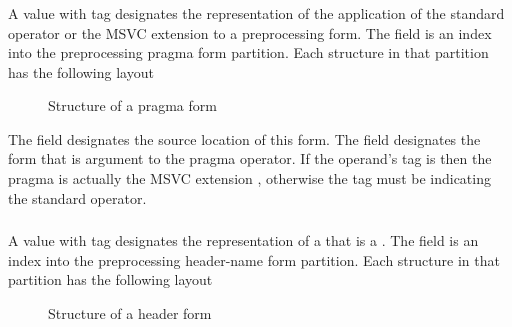 
\subsubsection{}
\label{sec:ifc:FormSort:Pragma}

A  value with tag  designates the
representation of the application of the standard  operator or
the MSVC extension  to a preprocessing form.
The  field is an index into
the preprocessing pragma form partition.  Each structure in that partition
has the following layout
%
\begin{figure}[H]
  \centering
  \caption{Structure of a pragma form}
  \label{fig:ifc-pragma-form}
\end{figure}

The field  designates the source location of this form.  The
field  designates the form that is argument to the pragma operator.
If the operand's tag is  then the pragma is actually
the MSVC extension , otherwise the tag must be 
 indicating the standard  operator.


\subsubsection{}
\label{sec:ifc:FormSort:Header}

A  value with tag  designates
the representation of a  that 
is a .
The  field is an index into
the preprocessing header-name form partition.  Each structure in that partition
has the following layout
%
\begin{figure}[H]
  \centering
  \caption{Structure of a header form}
  \label{fig:ifc-header-form}
\end{figure}

